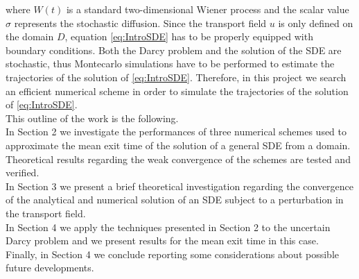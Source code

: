 where $W(t)$ is a standard two-dimensional Wiener process and the scalar value $\sigma$ represents the stochastic diffusion. Since the transport field $u$ is only defined on the domain $D$, equation \eqref{eq:IntroSDE} has to be properly equipped with boundary conditions. Both the Darcy problem and the solution of the SDE are stochastic, thus Montecarlo simulations have to be performed to estimate the trajectories of the solution of \eqref{eq:IntroSDE}. Therefore, in this project we search an efficient numerical scheme in order to simulate the trajectories of the solution of \eqref{eq:IntroSDE}. \\

\noindent This outline of the work is the following. \\
In Section 2 we investigate the performances of three numerical schemes used to approximate the mean exit time of the solution of a general SDE from a domain. Theoretical results regarding the weak convergence of the schemes are tested and verified. \\
In Section 3 we present a brief theoretical investigation regarding the convergence of the analytical and numerical solution of an SDE subject to a perturbation in the transport field. \\
In Section 4 we apply the techniques presented in Section 2 to the uncertain Darcy problem and we present results for the mean exit time in this case. \\
Finally, in Section 4 we conclude reporting some considerations about possible future developments.
